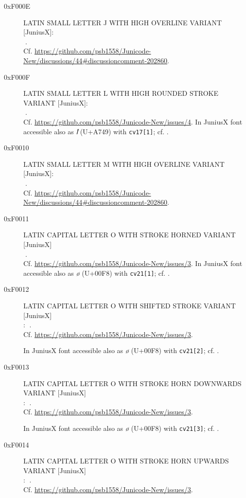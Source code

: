 \documentclass{mwart}
\newcommand{\Jglyph}[1]{{\relsize{2}\J#1}}
\begin{document}
\begin{description}
\item [0xF000E] LATIN SMALL LETTER J WITH HIGH OVERLINE  VARIANT [JuniusX]:\\
  \Jglyph{󰀎}.\\ Cf. \url{https://github.com/psb1558/Junicode-New/discussions/44#discussioncomment-202860}.
\item [0xF000F] LATIN SMALL LETTER L WITH HIGH ROUNDED STROKE VARIANT [JuniusX]:\\
  \Jglyph{󰀏}.\\  Cf. \url{https://github.com/psb1558/Junicode-New/issues/4}.
  In JuniusX font accessible also as \textit{ꝉ} (U+A749) with \texttt{cv17[1]};
  cf. \autocite[p. 9]{baker20:_opent_featur_junius_junius}.

\item [0xF0010] LATIN SMALL LETTER M WITH HIGH OVERLINE VARIANT [JuniusX]:\\
  \Jglyph{󰀐}.\\ Cf. \url{https://github.com/psb1558/Junicode-New/discussions/44#discussioncomment-202860}.
 \item [0xF0011] LATIN CAPITAL LETTER O WITH STROKE HORNED VARIANT [JuniusX]\\
  \Jglyph{󰀀}.\\  Cf. \url{https://github.com/psb1558/Junicode-New/issues/3}.
  In JuniusX font accessible also as \textit{ø} (U+00F8) with \texttt{cv21[1]};
  cf. \autocite[p. 9]{baker20:_opent_featur_junius_junius}.
\item [0xF0012] LATIN CAPITAL LETTER O WITH SHIFTED STROKE VARIANT [JuniusX]\\:
  \Jglyph{󰀒}.\\  Cf. \url{https://github.com/psb1558/Junicode-New/issues/3}.

  In JuniusX font accessible also as \textit{ø} (U+00F8) with \texttt{cv21[2]};
  cf. \autocite[p. 9]{baker20:_opent_featur_junius_junius}.
\item [0xF0013] LATIN CAPITAL LETTER O WITH STROKE HORN DOWNWARDS VARIANT [JuniusX]\\:
  \Jglyph{󰀓}.\\  Cf. \url{https://github.com/psb1558/Junicode-New/issues/3}.

  In JuniusX font accessible also as \textit{ø} (U+00F8) with \texttt{cv21[3]};
  cf. \autocite[p. 9]{baker20:_opent_featur_junius_junius}.
\item [0xF0014] LATIN CAPITAL LETTER O WITH STROKE HORN UPWARDS VARIANT [JuniusX]\\:
  \Jglyph{󰀓}.\\  Cf. \url{https://github.com/psb1558/Junicode-New/issues/3}.


\end{description}
\end{document}
